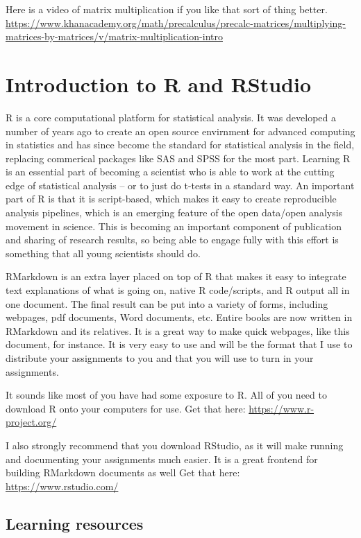 \documentclass[]{book}
\begin{document}
Here is a video of matrix multiplication if you like that sort of thing better.
\url{https://www.khanacademy.org/math/precalculus/precalc-matrices/multiplying-matrices-by-matrices/v/matrix-multiplication-intro}

\hypertarget{introduction-to-r-and-rstudio-1}{%
\section{Introduction to R and RStudio}\label{introduction-to-r-and-rstudio-1}}

R is a core computational platform for statistical analysis. It was developed a number of years ago to create an open source envirnment for advanced computing in statistics and has since become the standard for statistical analysis in the field, replacing commerical packages like SAS and SPSS for the most part. Learning R is an essential part of becoming a scientist who is able to work at the cutting edge of statistical analysis -- or to just do t-tests in a standard way. An important part of R is that it is script-based, which makes it easy to create reproducible analysis pipelines, which is an emerging feature of the open data/open analysis movement in science. This is becoming an important component of publication and sharing of research results, so being able to engage fully with this effort is something that all young scientists should do.

RMarkdown is an extra layer placed on top of R that makes it easy to integrate text explanations of what is going on, native R code/scripts, and R output all in one document. The final result can be put into a variety of forms, including webpages, pdf documents, Word documents, etc. Entire books are now written in RMarkdown and its relatives. It is a great way to make quick webpages, like this document, for instance. It is very easy to use and will be the format that I use to distribute your assignments to you and that you will use to turn in your assignments.

It sounds like most of you have had some exposure to R. All of you need to download R onto your computers for use. Get that here:
\url{https://www.r-project.org/}

I also strongly recommend that you download RStudio, as it will make running and documenting your assignments much easier. It is a great frontend for building RMarkdown documents as well Get that here:
\url{https://www.rstudio.com/}

\hypertarget{learning-resources-1}{%
\subsection{Learning resources}\label{learning-resources-1}}
\end{document}
